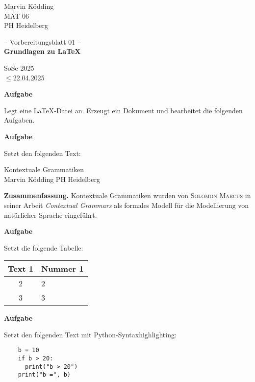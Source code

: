 \documentclass[a4paper, 12pt]{article}
\renewcommand{\date}{$\leq$22.04.2025}
\newcommand{\klasse}{MAT 06}
\newcommand{\institute}{PH Heidelberg}
\newcommand{\topic}{Grundlagen zu \LaTeX}
\newcommand{\semester}{SoSe 2025}
\newcommand{\blatt}{01}
\newcounter{Aufgabe}
\newenvironment{aufgabe}{\addtocounter{Aufgabe}{1}%
	\textbf{Aufgabe \theAufgabe}
	
	\vspace*{-0.3em}}{\medskip}
\begin{document}
	\pagestyle{empty}
	\begin{minipage}{0.2\textwidth}
		Marvin Ködding\\\scriptsize \klasse\\\institute
	\end{minipage}
	\begin{minipage}{.6\textwidth}
		\centering
		-- Vorbereitungsblatt \blatt{} --\\\textbf{\topic}
	\end{minipage}
	\begin{minipage}{.2\textwidth}
		\flushright \semester\\\scriptsize \date
	\end{minipage}
	
	\vspace*{1cm}
	
	\begin{aufgabe}
		Legt eine \LaTeX-Datei an. Erzeugt ein Dokument und bearbeitet die folgenden Aufgaben.
	\end{aufgabe}
	
	\begin{aufgabe}
		Setzt den folgenden Text:
		
		\begin{center}
			Kontextuale Grammatiken\\
			\tiny Marvin Ködding \qquad PH Heidelberg
		\end{center}
		
		\textbf{Zusammenfassung.} \textsf{Kontextuale Grammatiken} wurden von \textsc{Solomon Marcus} in seiner Arbeit \textit{Contextual Grammars} als formales Modell für die Modellierung von \glqq{}natürlicher Sprache\grqq{} eingeführt.
	\end{aufgabe}
	
	\begin{aufgabe}
		Setzt die folgende Tabelle:
		
		\begin{center}
			\begin{tabular}{c|l}
				Text 1 & Nummer 1\\
				\hline
				2 & 2\\
				\hline
				3 & 3
			\end{tabular}
		\end{center}
	\end{aufgabe}
	
	\begin{aufgabe}
		Setzt den folgenden Text mit Python-Syntaxhighlighting:
		
		\begin{verbatim}
	b = 10
	if b > 20:
	  print("b > 20")
	print("b =", b)
		\end{verbatim}
	\end{aufgabe}
\end{document}
